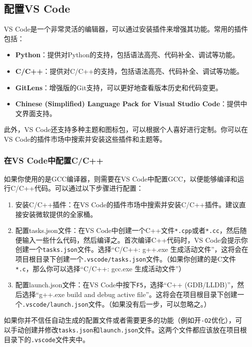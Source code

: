 \documentclass[../main.tex]{subfiles}
\begin{document}
\subsection{配置VS Code}

VS Code是一个非常灵活的编辑器，可以通过安装插件来增强其功能。常用的插件包括：

\begin{itemize}
  \item \textbf{Python}：提供对Python的支持，包括语法高亮、代码补全、调试等功能。
  \item \textbf{C/C++}：提供对C/C++的支持，包括语法高亮、代码补全、调试等功能。
  \item \textbf{GitLens}：增强版的Git支持，可以更好地查看版本历史和代码变更。
  \item \textbf{Chinese (Simplified) Language Pack for Visual Studio Code}：提供中文界面支持。
\end{itemize}

此外，VS Code还支持多种主题和图标包，可以根据个人喜好进行定制。你可以在VS Code的插件市场中搜索并安装这些插件和主题等。

\subsubsection{在VS Code中配置C/C++}\label{sec:configure-cpp}

如果你使用的是GCC编译器，则需要在VS Code中配置GCC，以便能够编译和运行C/C++代码。可以通过以下步骤进行配置：

\begin{enumerate}
  \item 安装C/C++插件：在VS Code的插件市场中搜索并安装C/C++插件。建议直接安装微软提供的全家桶。
  \item 配置tasks.json文件：在VS Code中创建一个C++文件\texttt{*.cpp}或者\texttt{*.cc}，然后随便输入一些什么代码，然后编译之。首次编译C++代码时，VS Code会提示你创建一个\texttt{tasks.json}文件。选择“C/C++: g++.exe 生成活动文件”，这将会在项目根目录下创建一个\texttt{.vscode/tasks.json}文件。（如果你创建的是C文件\texttt{*.c}，那么你可以选择“C/C++: gcc.exe 生成活动文件”）
  \item 配置launch.json文件：在VS Code中按下\texttt{F5}，选择“C++ (GDB/LLDB)”，然后选择“g++.exe build and debug active file”。这将会在项目根目录下创建一个\texttt{.vscode/launch.json}文件。（如果没有后一步，可以忽略之。）
\end{enumerate}

如果你并不信任自动生成的配置文件或者需要更多的功能（例如开\texttt{-O2}优化），可以手动创建并修改\texttt{tasks.json}和\texttt{launch.json}文件。这两个文件都应该放在项目根目录下的\texttt{.vscode}文件夹中。
\end{document}
